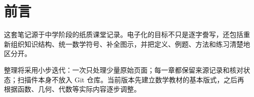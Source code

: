 \chapter{前言}

这套笔记源于中学阶段的纸质课堂记录。电子化的目标不只是逐字誊写，还包括重新组织知识结构、统一数学符号、补全图示，并把定义、例题、方法和练习清楚地区分开。

整理将采用小步迭代：一次只处理少量原始页面；每一章都保留来源记录和核对状态；扫描件本身不放入 Git 仓库。当前版本先建立数学教材的基本版式，之后再根据函数、几何、代数等实际内容逐步调整。
